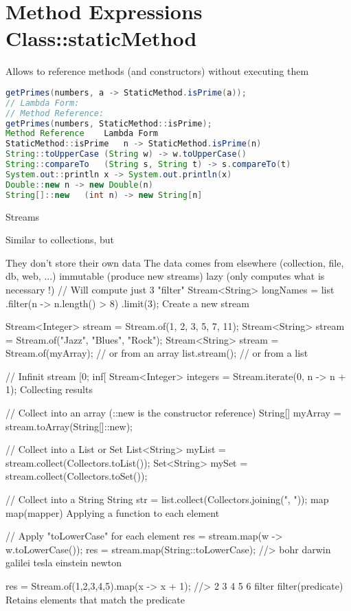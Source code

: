 \section{Method Expressions Class::staticMethod}

Allows to reference methods (and constructors) without executing them

\begin{lstlisting}[language=Java]
getPrimes(numbers, a -> StaticMethod.isPrime(a));
// Lambda Form:
// Method Reference:
getPrimes(numbers, StaticMethod::isPrime);
Method Reference	Lambda Form
StaticMethod::isPrime	n -> StaticMethod.isPrime(n)
String::toUpperCase	(String w) -> w.toUpperCase()
String::compareTo	(String s, String t) -> s.compareTo(t)
System.out::println	x -> System.out.println(x)
Double::new	n -> new Double(n)
String[]::new	(int n) -> new String[n]
\end{lstlisting}

Streams

Similar to collections, but

They don't store their own data
The data comes from elsewhere (collection, file, db, web, ...)
immutable (produce new streams)
lazy (only computes what is necessary !)
// Will compute just 3 "filter"
Stream<String> longNames = list
   .filter(n -> n.length() > 8)
   .limit(3);
Create a new stream

Stream<Integer> stream = Stream.of(1, 2, 3, 5, 7, 11);
Stream<String> stream = Stream.of("Jazz", "Blues", "Rock");
Stream<String> stream = Stream.of(myArray); // or from an array
list.stream(); // or from a list

// Infinit stream [0; inf[
Stream<Integer> integers = Stream.iterate(0, n -> n + 1);
Collecting results

// Collect into an array (::new is the constructor reference)
String[] myArray = stream.toArray(String[]::new);

// Collect into a List or Set
List<String> myList = stream.collect(Collectors.toList());
Set<String> mySet = stream.collect(Collectors.toSet());

// Collect into a String
String str = list.collect(Collectors.joining(", "));
map map(mapper)
Applying a function to each element

// Apply "toLowerCase" for each element
res = stream.map(w -> w.toLowerCase());
res = stream.map(String::toLowerCase);
//> bohr darwin galilei tesla einstein newton

res = Stream.of(1,2,3,4,5).map(x -> x + 1);
//> 2 3 4 5 6
filter filter(predicate)
Retains elements that match the predicate

